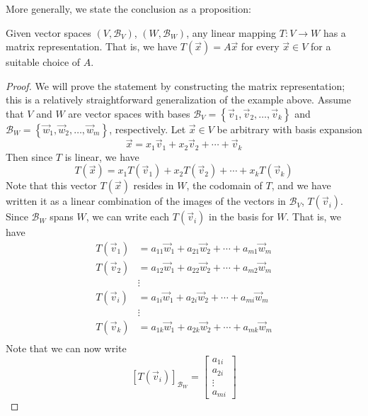 More generally, we state the conclusion as a proposition:
\begin{prop}
Given vector spaces $\left(V, \mathcal{B}_V\right)$, $\left(W, \mathcal{B}_W\right)$, any linear mapping $T:V\rightarrow W$ has a matrix representation. That is, we have $ T\left(\vec{x}\right) = A \vec{x}$ for every $\vec{x}\in V$ for a suitable choice of $A$.
\end{prop}
\begin{proof}
We will prove the statement by constructing the matrix representation; this is a relatively straightforward generalization of the example above. Assume that $V$ and $W$ are vector spaces with bases $\mathcal{B}_V = \left\{ \vec{v}_1, \vec{v}_2, \ldots, \vec{v}_k \right\}$ and $\mathcal{B}_W = \left\{ \vec{w}_1, \vec{w}_2, \ldots, \vec{w}_m \right\}$, respectively. Let $\vec{x}\in V$ be arbitrary with basis expansion \[ \vec{x} = x_1 \vec{v}_1 + x_2 \vec{v}_2 + \cdots + \vec{v}_k \] Then since $T$ is linear, we have \[ T\left(\vec{x}\right) = x_1 T\left(\vec{v}_1\right) + x_2 T\left(\vec{v}_2\right) + \cdots + x_k T\left(\vec{v}_k\right) \] Note that this vector $T\left(\vec{x}\right)$ resides in $W$, the codomain of $T$, and we have written it as a linear combination of the images of the vectors in $\mathcal{B}_V$, $T\left(\vec{v}_i\right)$. Since $\mathcal{B}_W$ spans $W$, we can write each $T\left(\vec{v}_i\right)$ in the basis for $W$. That is, we have  \begin{align*} 
T\left(\vec{v}_1\right) & = a_{11} \vec{w}_1 + a_{21} \vec{w}_2 + \cdots + a_{m1} \vec{w}_m \\
T\left(\vec{v}_2\right) & = a_{12} \vec{w}_1 + a_{22} \vec{w}_2 + \cdots + a_{m2} \vec{w}_m \\
& \vdots \\
T\left(\vec{v}_i\right) & = a_{1i} \vec{w}_1 + a_{2i} \vec{w}_2 + \cdots + a_{mi} \vec{w}_m \\
& \vdots \\
T\left(\vec{v}_k\right) & = a_{1k} \vec{w}_1 + a_{2k} \vec{w}_2 + \cdots + a_{mk} \vec{w}_m \\
\end{align*} 
Note that we can now write \[ \left[ T\left(\vec{v}_i\right) \right]_{\mathcal{B}_W} = \left[ \begin{array}{c} a_{1i} \\ a_{2i} \\ \vdots \\ a_{mi} \end{array} \right] \]

\end{proof}

